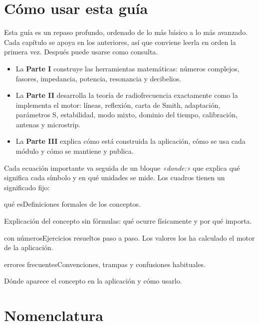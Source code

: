 \chapter*{Cómo usar esta guía}

Esta guía es un repaso profundo, ordenado de lo más básico a lo más avanzado. Cada capítulo se apoya en los anteriores, así que
conviene leerla en orden la primera vez. Después puede usarse como consulta.

\begin{itemize}
  \item La \textbf{Parte I} construye las herramientas matemáticas: números complejos, fasores, impedancia, potencia,
        resonancia y decibelios.
  \item La \textbf{Parte II} desarrolla la teoría de radiofrecuencia exactamente como la implementa el motor: líneas,
        reflexión, carta de Smith, adaptación, parámetros S, estabilidad, modo mixto, dominio del tiempo, calibración, antenas y microstrip.
  \item La \textbf{Parte III} explica cómo está construida la aplicación, cómo se usa cada módulo y cómo se mantiene y publica.
\end{itemize}

Cada ecuación importante va seguida de un bloque \emph{«donde:»} que explica qué significa cada símbolo y en qué unidades se mide.
Los cuadros tienen un significado fijo:

\begin{definicion}{qué es}Definiciones formales de los conceptos.\end{definicion}
\begin{intuicion}Explicación del concepto sin fórmulas: qué ocurre físicamente y por qué importa.\end{intuicion}
\begin{ejemplo}{con números}Ejercicios resueltos paso a paso. Los valores los ha calculado el motor de la aplicación.\end{ejemplo}
\begin{atencion}{errores frecuentes}Convenciones, trampas y confusiones habituales.\end{atencion}
\begin{enlaapp}Dónde aparece el concepto en la aplicación y cómo usarlo.\end{enlaapp}

\chapter*{Nomenclatura}

